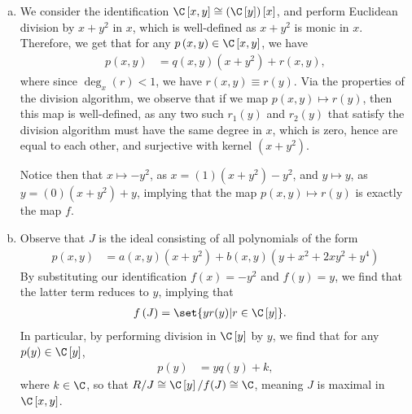 \documentclass[10pt]{mypackage}
\begin{document}
\begin{solution}\hfill
  \begin{enumerate}[(a)]
    \item We consider the identification $\C\left[ x,y \right] \cong \left( \C\left[ y \right] \right)\left[ x \right]$, and perform Euclidean division by $x + y^2$ in $x$, which is well-defined as $x + y^2$ is monic in $x$. Therefore, we get that for any $p\left( x,y \right)\in \C\left[ x,y \right]$, we have
      \begin{align*}
        p\left( x,y \right) &= q\left( x,y \right)\left( x + y^2 \right) + r\left( x,y \right),
      \end{align*}
      where since $\deg_{x}\left( r \right) < 1$, we have $r\left( x,y \right) \equiv r(y)$. Via the properties of the division algorithm, we observe that if we map $p\left( x,y \right) \mapsto r\left( y \right)$, then this map is well-defined, as any two such $r_1\left( y \right)$ and $r_2\left( y \right)$ that satisfy the division algorithm must have the same degree in $x$, which is zero, hence are equal to each other, and surjective with kernel $\left( x + y^2 \right)$.\newline

      Notice then that $x\mapsto -y^2$, as $x = \left( 1 \right)\left( x+y^2 \right) - y^2$, and $y\mapsto y$, as $y = \left( 0 \right)\left( x + y^2 \right) + y$, implying that the map $p\left( x,y \right)\mapsto r\left( y \right)$ is exactly the map $f$.
    \item Observe that $J$ is the ideal consisting of all polynomials of the form
      \begin{align*}
        p\left( x,y \right) &= a\left( x,y \right)\left( x + y^2 \right) + b\left( x,y \right)\left( y + x^2 + 2xy^2 + y^4 \right)
      \end{align*}
      By substituting our identification $f\left( x \right) = -y^2$ and $f\left( y \right) = y$, we find that the latter term reduces to $y$, implying that
      \begin{align*}
        f\left( J \right) &= \set{yr(y) | r\in \C\left[ y \right]}.
      \end{align*}
      In particular, by performing division in $\C\left[ y \right]$ by $y$, we find that for any $p(y)\in \C\left[ y \right]$,
      \begin{align*}
        p(y) &= yq\left( y \right) + k,
      \end{align*}
      where $k \in \C$, so that $R/J \cong \C\left[ y \right]/f(J) \cong \C$, meaning $J$ is maximal in $\C\left[ x,y \right]$.
  \end{enumerate}
\end{solution}
\end{document}

